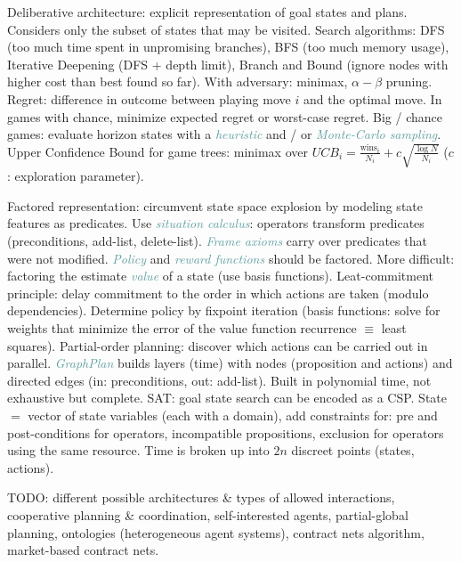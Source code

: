 \documentclass[10pt,a4paper,landscape]{article}
\newcommand{\concept}[1]{\textcolor{Emerald}{#1}} %
\newcommand{\subconcept}[1]{\textcolor{CadetBlue}{\textit{#1}}}
\renewcommand{\section}[1]{
  \vspace{-0.3cm}
  \begin{center}
    \color{Bittersweet}
    \hrulefill{\small~~#1~~}\hrulefill
  \end{center}
  \vspace{-0.3cm}
}
\begin{document}
\begin{multicols*}{4}
\concept{Deliberative architecture}: explicit representation of goal states and plans. Considers only the subset of states that may be visited.
\concept{Search algorithms}: DFS (too much time spent in unpromising branches), BFS (too much memory usage), Iterative Deepening (DFS + depth limit), Branch and Bound (ignore nodes with higher cost than best found so far). With adversary: minimax, $\alpha-\beta$ pruning.
\concept{Regret}: difference in outcome between playing move $i$ and the optimal move. In games with chance, minimize expected regret or worst-case regret.
Big / chance games: evaluate horizon states with a \subconcept{heuristic} and / or \subconcept{Monte-Carlo sampling}.
\concept{Upper Confidence Bound} for game trees: minimax over $UCB_i = \frac{\text{wins}_i}{N_i} + c \sqrt{\frac{\log{N}}{N_i}}$ ($c$: exploration parameter).

\concept{Factored representation}: circumvent state space explosion by modeling state features as predicates. Use \subconcept{situation calculus}: operators transform predicates (preconditions, add-list, delete-list). \subconcept{Frame axioms} carry over predicates that were not modified.
\subconcept{Policy} and \subconcept{reward functions} should be factored. More difficult: factoring the estimate \subconcept{value} of a state (use basis functions).
\concept{Leat-commitment principle}: delay commitment to the order in which actions are taken (modulo dependencies). Determine policy by fixpoint iteration (basis functions: solve for weights that minimize the error of the value function recurrence $\equiv$ least squares).
\concept{Partial-order planning}: discover which actions can be carried out in parallel.
\subconcept{GraphPlan} builds layers (time) with nodes (proposition and actions) and directed edges (in: preconditions, out: add-list). Built in polynomial time, not exhaustive but complete.
\concept{SAT}: goal state search can be encoded as a CSP. State $=$ vector of state variables (each with a domain), add constraints for: pre and post-conditions for operators, incompatible propositions, exclusion for operators using the same resource. Time is broken up into $2n$ discreet points (states, actions).

\section{Multiagent systems}

TODO: different possible architectures \& types of allowed interactions, cooperative planning \& coordination, self-interested agents, partial-global planning, ontologies (heterogeneous agent systems), contract nets algorithm, market-based contract nets.


\end{multicols*}
\end{document}
